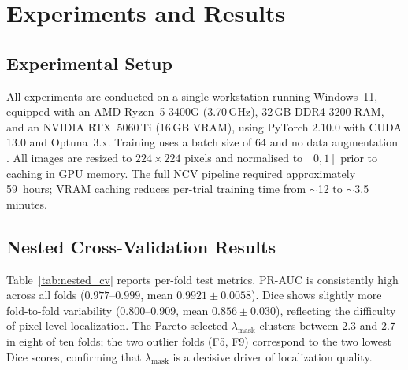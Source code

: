 
\section{Experiments and Results}
\label{sec:experiments}

\subsection{Experimental Setup}
\label{subsec:setup}

All experiments are conducted on a single workstation running Windows~11,
equipped with an AMD Ryzen~5 3400G (3.70\,GHz), 32\,GB DDR4-3200 RAM, and an NVIDIA
RTX~5060\,Ti (16\,GB VRAM), using PyTorch 2.10.0 with CUDA 13.0 and
Optuna~3.x. Training uses a batch size of 64 and no data augmentation
.
All images are resized to $224\!\times\!224$ pixels and normalised to
$[0,1]$ prior to caching in GPU memory.
The full NCV pipeline required
approximately 59~hours; VRAM caching reduces per-trial training time from
$\sim$12 to $\sim$3.5 minutes. 

\subsection{Nested Cross-Validation Results}
\label{subsec:ncv_results}

Table~\ref{tab:nested_cv} reports per-fold test metrics. PR-AUC is
consistently high across all folds ($0.977$--$0.999$, mean $0.9921 \pm
0.0058$). Dice shows slightly more fold-to-fold variability ($0.800$--$0.909$,
mean $0.856 \pm 0.030$), reflecting the difficulty of pixel-level localization.
The Pareto-selected $\lambda_{\text{mask}}$ clusters between 2.3 and 2.7 in
eight of ten folds; the two outlier folds (F5, F9) correspond to the two lowest
Dice scores, confirming that $\lambda_{\text{mask}}$ is a decisive driver of
localization quality.

